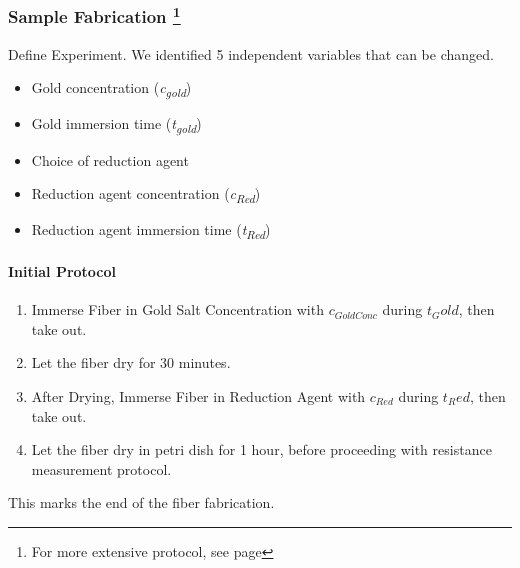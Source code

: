\subsubsection[Sample Fabrication]{Sample Fabrication \label{subsec:SampleFab} \footnote{For more extensive protocol, see page \pageref{App:Protocols}}}


Define Experiment. We identified 5 independent variables that can be changed.


\begin{multicols}{2}
\begin{itemize}
    \item Gold concentration (\textit{c\textsubscript{gold}})
    \item Gold immersion time (\textit{t\textsubscript{gold}})
    \item Choice of reduction agent
    \item Reduction agent concentration (\textit{c\textsubscript{Red}})
    \item Reduction agent immersion time (\textit{t\textsubscript{Red}})
\end{itemize}
\end{multicols}




\paragraph{Initial Protocol}

\begin{enumerate}
	
	\item Immerse Fiber in Gold Salt Concentration with $c_{GoldConc}$ during $t_Gold$, then take out.

	\item Let the fiber dry for 30 minutes.
	
	\item After Drying, Immerse Fiber in Reduction Agent with $c_{Red}$ during $t_Red$, then take out.
	
	\item Let the fiber dry in petri dish for 1 hour, before proceeding with resistance measurement protocol.

    \end{enumerate}
    
    \begin{center}
        This marks the end of the fiber fabrication.
    \end{center}


